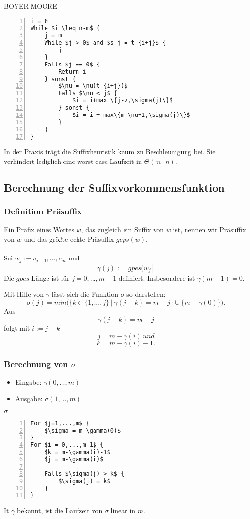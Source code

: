\begin{minipage}{\textwidth}
BOYER-MOORE
\begin{lstlisting}[frame=single,numbers=left,mathescape]
i = 0
While $i \leq n-m$ {
	j = m
	While $j > 0$ and $s_j = t_{i+j}$ {
		j--
	}
	Falls $j == 0$ {
		Return i
	} sonst {
		$\nu = \nu(t_{i+j})$
		Falls $\nu < j$ {
			$i = i+max \{j-v,\sigma(j)\}$
		} sonst {
			$i = i + max\{m-\nu+1,\sigma(j)\}$
		}
	}
}
\end{lstlisting}
\end{minipage}
In der Praxis trägt die Suffixheuristik kaum zu Beschleunigung bei. Sie verhindert lediglich eine worst-case-Laufzeit in \(\Theta(m\cdot n)\).


\subsection{Berechnung der Suffixvorkommensfunktion}

\subsubsection{Definition Präsuffix}
Ein Präfix eines Wortes \(w\), das zugleich ein Suffix von \(w\) ist, nennen wir Präsuffix von \(w\) und das größte echte Präsuffix \(geps(w)\).
\\\\
Sei \(w_j := s_{j+1},...,s_m\) und
\[\gamma(j) := |gpes(w_j|.\]
Die \(gpes\)-Länge ist für \(j=0,...,m-1\) definiert. Insbesondere ist \(\gamma(m-1)=0\).

Mit Hilfe von \(\gamma\) lässt sich die Funktion \(\sigma\) so darstellen:
\[\sigma(j) = min\Big( \{k\in \{1,...,j\} ~|~\gamma(j-k) = m-j\} \cup \{m-\gamma(0)\}\Big).\]
Aus
\[\gamma(j-k) = m-j\]
folgt mit \(i := j-k\)
\[j = m-\gamma(i)~und\]
\[k = m-\gamma(i)-1.\]

\subsubsection{Berechnung von \(\sigma\)}
\begin{itemize}
	\item Eingabe: \(\gamma(0,...,m)\)
	\item Ausgabe: \(\sigma(1,...,m)\)
\end{itemize}

\begin{minipage}{\textwidth}
\(\sigma\)
\begin{lstlisting}[frame=single,numbers=left,mathescape]
For $j=1,...,m$ {
	$\sigma = m-\gamma(0)$
}
For $i = 0,...,m-1$ {
	$k = m-\gamma(i)-1$
	$j = m-\gamma(i)$

	Falls $\sigma(j) > k$ {
		$\sigma(j) = k$
	}
}
\end{lstlisting}
\end{minipage}
It \(\gamma\) bekannt, ist die Laufzeit von \(\sigma\) linear in \(m\).

